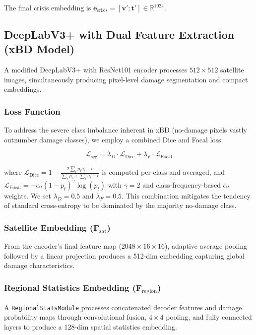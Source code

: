 \documentclass[journal]{IEEEtran}
\begin{document}
The final crisis embedding is $\mathbf{e}_\text{crisis} = [\mathbf{v}'; \mathbf{t}'] \in \mathbb{R}^{1024}$.

\subsection{DeepLabV3+ with Dual Feature Extraction (xBD Model)}

A modified DeepLabV3+ with ResNet101 encoder processes $512 \times 512$ satellite images, simultaneously producing pixel-level damage segmentation and compact embeddings.

\subsubsection{Loss Function}

To address the severe class imbalance inherent in xBD (no-damage pixels vastly outnumber damage classes), we employ a combined Dice and Focal loss:

\begin{equation}
\mathcal{L}_\text{seg} = \lambda_D \cdot \mathcal{L}_\text{Dice} + \lambda_F \cdot \mathcal{L}_\text{Focal}
\end{equation}

where $\mathcal{L}_\text{Dice} = 1 - \frac{2\sum_i p_i g_i + \epsilon}{\sum_i p_i + \sum_i g_i + \epsilon}$ is computed per-class and averaged, and $\mathcal{L}_\text{Focal} = -\alpha_t (1-p_t)^\gamma \log(p_t)$ with $\gamma=2$ and class-frequency-based $\alpha_t$ weights. We set $\lambda_D = 0.5$ and $\lambda_F = 0.5$. This combination mitigates the tendency of standard cross-entropy to be dominated by the majority no-damage class.

\subsubsection{Satellite Embedding ($\mathbf{F}_\text{sat}$)}

From the encoder's final feature map ($2048 \times 16 \times 16$), adaptive average pooling followed by a linear projection produces a 512-dim embedding capturing global damage characteristics.

\subsubsection{Regional Statistics Embedding ($\mathbf{F}_\text{region}$)}

A \texttt{RegionalStatsModule} processes concatenated decoder features and damage probability maps through convolutional fusion, $4 \times 4$ pooling, and fully connected layers to produce a 128-dim spatial statistics embedding.
\end{document}
